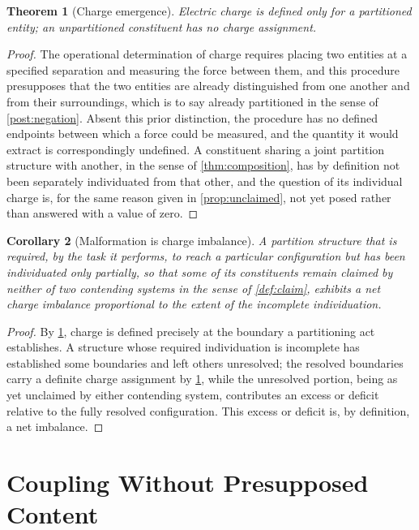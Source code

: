 \documentclass[11pt,twocolumn,a4paper]{article}
\theoremstyle{plain}
\newtheorem{theorem}{Theorem}[section]
\newtheorem{corollary}[theorem]{Corollary}
\theoremstyle{definition}
\theoremstyle{remark}
\begin{document}
\begin{theorem}[Charge emergence]
\label{thm:charge}
Electric charge is defined only for a partitioned entity; an unpartitioned
constituent has no charge assignment.
\end{theorem}

\begin{proof}
The operational determination of charge requires placing two entities at a
specified separation and measuring the force between them, and this
procedure presupposes that the two entities are already distinguished from
one another and from their surroundings, which is to say already
partitioned in the sense of \cref{post:negation}. Absent this prior
distinction, the procedure has no defined endpoints between which a force
could be measured, and the quantity it would extract is correspondingly
undefined. A constituent sharing a joint partition structure with another,
in the sense of \cref{thm:composition}, has by definition not been
separately individuated from that other, and the question of its
individual charge is, for the same reason given in \cref{prop:unclaimed},
not yet posed rather than answered with a value of zero.
\end{proof}

\begin{corollary}[Malformation is charge imbalance]
\label{cor:malformation}
A partition structure that is required, by the task it performs, to reach a
particular configuration but has been individuated only partially, so that
some of its constituents remain claimed by neither of two contending
systems in the sense of \cref{def:claim}, exhibits a net charge imbalance
proportional to the extent of the incomplete individuation.
\end{corollary}

\begin{proof}
By \cref{thm:charge}, charge is defined precisely at the boundary a
partitioning act establishes. A structure whose required individuation is
incomplete has established some boundaries and left others unresolved; the
resolved boundaries carry a definite charge assignment by \cref{thm:charge},
while the unresolved portion, being as yet unclaimed by either contending
system, contributes an excess or deficit relative to the fully resolved
configuration. This excess or deficit is, by definition, a net imbalance.
\end{proof}

\section{Coupling Without Presupposed Content}
\label{sec:coupling}
\end{document}
